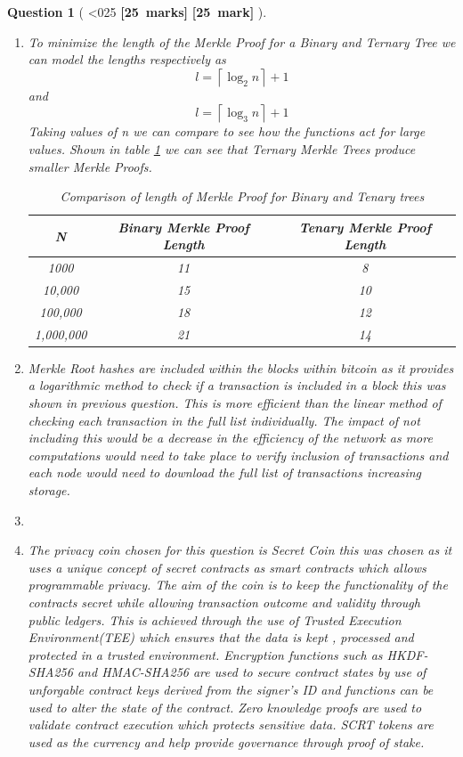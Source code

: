 \documentclass[a4paper]{article}
\theoremstyle{que}
\newtheorem{question}{Question}
\newcommand\points[1]{%
\ifnum1<0#1\relax%
    {\bf \small [#1~marks]}%
  \else%
    {\bf \small [#1~mark]}%
  \fi%
}%
\begin{document}
\begin{question}[\points{25}]
\begin{enumerate}[label=(\alph*)]
    \item[(iii)] To minimize the length of the Merkle Proof for a Binary and Ternary Tree we can model the lengths respectively as \[ l = \left\lceil \log_2 n \right\rceil + 1\] and \[ l = \left\lceil \log_3 n \right\rceil + 1\]
    Taking values of n we can compare to see how the functions act for large values. Shown in table \ref{table:two_column_blank} we can see that Ternary Merkle Trees produce smaller Merkle Proofs.
    \begin{table}[h!]
    \centering
    \begin{tabular}{|c|c|c|}
    \hline
    \textbf{N} & \textbf{Binary Merkle Proof Length} & \textbf{Tenary Merkle Proof Length} \\ 
    \hline
             1000 &  11 &   8   \\ 
    \hline
                  10,000  &  15 &    10            \\ 
    \hline
                100,000     & 18  &      12          \\ 
    \hline
               1,000,000      &  21  &       14        \\ 
    \hline
    \end{tabular}
    \caption{Comparison of length of Merkle Proof for Binary and Tenary trees}
    \label{table:two_column_blank}
    \end{table}
    
    \item Merkle Root hashes are included within the blocks within bitcoin as it provides a logarithmic method to check if a transaction is included in a block this was shown in previous question. This is more efficient than the linear method of checking each transaction in the full list individually. The impact of not including this would be a decrease in the efficiency of the network as more computations would need to take place to verify inclusion of transactions and each node would need to download the full list of transactions increasing storage. 
    
    \item
    \item[(i)] The privacy coin chosen for this question is Secret Coin \cite{secret_network_graypaper} this was chosen as it uses a unique concept of secret contracts as smart contracts which allows programmable privacy. The aim of the coin is to keep the functionality of the contracts secret while allowing transaction outcome and validity through public ledgers. This is achieved through the use of Trusted Execution Environment(TEE) which ensures that the data is kept , processed and protected in a trusted environment. Encryption functions such as HKDF-SHA256 and HMAC-SHA256 are used to secure contract states by use of unforgable contract keys derived from the signer's ID and functions can be used to alter the state of the contract. Zero knowledge proofs are used to validate contract execution which protects sensitive data. SCRT tokens are used as the currency and help provide governance through proof of stake. \cite{secret_foundation_docs}
    

\end{enumerate}
\end{question}
\end{document}
